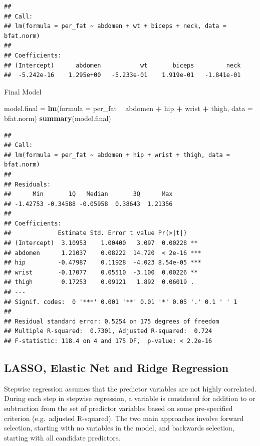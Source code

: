 \documentclass[]{article}
\newenvironment{Shaded}{\begin{snugshade}}{\end{snugshade}}
\newcommand{\KeywordTok}[1]{\textcolor[rgb]{0.13,0.29,0.53}{\textbf{#1}}}
\newcommand{\DataTypeTok}[1]{\textcolor[rgb]{0.13,0.29,0.53}{#1}}
\newcommand{\StringTok}[1]{\textcolor[rgb]{0.31,0.60,0.02}{#1}}
\newcommand{\OperatorTok}[1]{\textcolor[rgb]{0.81,0.36,0.00}{\textbf{#1}}}
\newcommand{\NormalTok}[1]{#1}
\begin{document}
\begin{verbatim}
## 
## Call:
## lm(formula = per_fat ~ abdomen + wt + biceps + neck, data = bfat.norm)
## 
## Coefficients:
## (Intercept)      abdomen           wt       biceps         neck  
##  -5.242e-16    1.295e+00   -5.233e-01    1.919e-01   -1.841e-01
\end{verbatim}

Final Model

\begin{Shaded}
\begin{Highlighting}[]
\NormalTok{model.final =}\StringTok{ }\KeywordTok{lm}\NormalTok{(}\DataTypeTok{formula =}\NormalTok{ per_fat }\OperatorTok{~}\StringTok{ }\NormalTok{abdomen }\OperatorTok{+}\StringTok{ }\NormalTok{hip }\OperatorTok{+}\StringTok{ }\NormalTok{wrist }
                 \OperatorTok{+}\StringTok{ }\NormalTok{thigh, }\DataTypeTok{data =}\NormalTok{ bfat.norm)}
\KeywordTok{summary}\NormalTok{(model.final)}
\end{Highlighting}
\end{Shaded}

\begin{verbatim}
## 
## Call:
## lm(formula = per_fat ~ abdomen + hip + wrist + thigh, data = bfat.norm)
## 
## Residuals:
##      Min       1Q   Median       3Q      Max 
## -1.42753 -0.34588 -0.05958  0.38643  1.21356 
## 
## Coefficients:
##             Estimate Std. Error t value Pr(>|t|)    
## (Intercept)  3.10953    1.00400   3.097  0.00228 ** 
## abdomen      1.21037    0.08222  14.720  < 2e-16 ***
## hip         -0.47987    0.11928  -4.023 8.54e-05 ***
## wrist       -0.17077    0.05510  -3.100  0.00226 ** 
## thigh        0.17253    0.09121   1.892  0.06019 .  
## ---
## Signif. codes:  0 '***' 0.001 '**' 0.01 '*' 0.05 '.' 0.1 ' ' 1
## 
## Residual standard error: 0.5254 on 175 degrees of freedom
## Multiple R-squared:  0.7301, Adjusted R-squared:  0.724 
## F-statistic: 118.4 on 4 and 175 DF,  p-value: < 2.2e-16
\end{verbatim}

\subsection{LASSO, Elastic Net and Ridge
Regression}\label{lasso-elastic-net-and-ridge-regression}

Stepwise regression assumes that the predictor variables are not highly
correlated. During each step in stepwise regression, a variable is
considered for addition to or subtraction from the set of predictor
variables based on some pre-specified criterion (e.g.~adjusted
R-squared). The two main approaches involve forward selection, starting
with no variables in the model, and backwards selection, starting with
all candidate predictors.
\end{document}
